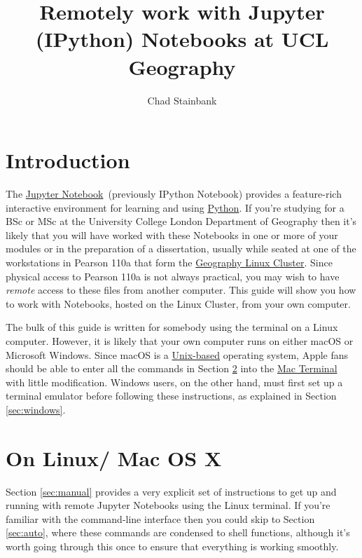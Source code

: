\documentclass[a4paper]{article}
\title{Remotely work with Jupyter (IPython) Notebooks at UCL Geography}
\author{Chad Stainbank}
\begin{document}
\maketitle
\section{Introduction}
\label{sec:intro}
The \href{http://jupyter.org/}{Jupyter Notebook}~(previously IPython Notebook) provides a feature-rich interactive environment for learning and using \href{https://www.python.org/}{Python}.
If you're studying for a BSc or MSc at the University College London Department of Geography then it's likely that you will have worked with these Notebooks in one or more of your modules or in the preparation of a dissertation, usually while seated at one of the workstations in Pearson 110a that form the \href{http://www.geog.ucl.ac.uk/resources/computer-support/teaching-cluster}{Geography Linux Cluster}.
Since physical access to Pearson 110a is not always practical, you may wish to have \emph{remote} access to these files from another computer.
This guide will show you how to work with Notebooks, hosted on the Linux Cluster, from your own computer. 

The bulk of this guide is written for somebody using the terminal on a Linux computer.
However, it is likely that your own computer runs on either macOS or Microsoft Windows.
Since macOS is a \href{http://unix.stackexchange.com/questions/1489/is-mac-os-x-unix}{Unix-based} operating system, Apple fans should be able to enter all the commands in Section \ref{sec:linuxmac} into the \href{http://www.macworld.co.uk/feature/mac-software/get-more-out-of-os-x-terminal-3608274/}{Mac Terminal} with little modification.
Windows users, on the other hand, must first set up a terminal emulator before following these instructions, as explained in Section \ref{sec:windows}.

\section{On Linux/ Mac OS X}
\label{sec:linuxmac}
Section \ref{sec:manual} provides a very explicit set of instructions to get up and running with remote Jupyter Notebooks using the Linux terminal.
If you're familiar with the command-line interface then you could skip to Section \ref{sec:auto}, where these commands are condensed to shell functions, although it's worth going through this once to ensure that everything is working smoothly.
\end{document}
